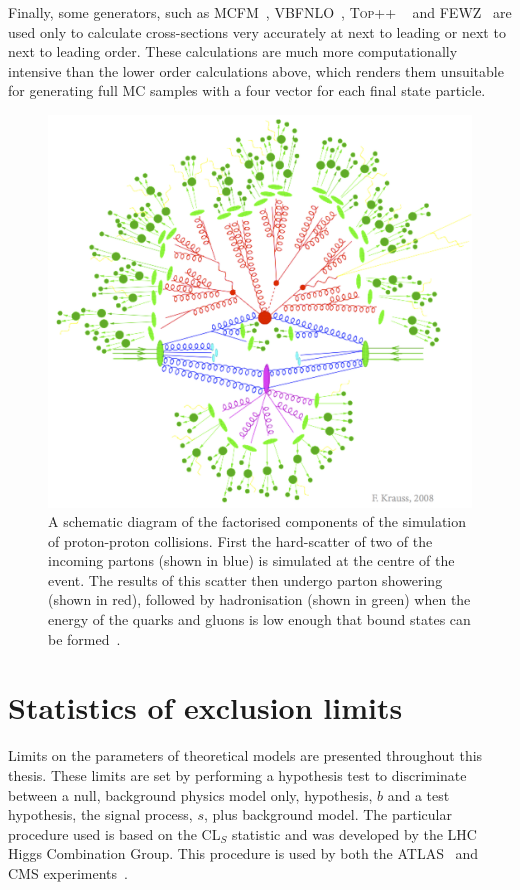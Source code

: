 Finally, some generators, such as MCFM~\cite{PhysRevD.68.094021}, VBFNLO~\cite{Baglio:2014uba,Arnold:2011wj,Arnold20091661}, \textsc{Top++} ~\cite{Czakon20142930} and \textsc{FEWZ}~\cite{PhysRevD.86.094034} are used only to calculate cross-sections very accurately at next to leading or next to next to leading order. These calculations are much more computationally intensive than the lower order calculations above, which renders them unsuitable for generating full \ac{MC} samples with a four vector for each final state particle.

\begin{figure}
  \includegraphics[width=\largefigwidth]{plots/theory/factorisation.png}
  \caption{A schematic diagram of the factorised components of the simulation of proton-proton collisions. First the hard-scatter of two of the incoming partons (shown in blue) is simulated at the centre of the event. The results of this scatter then undergo parton showering (shown in red), followed by hadronisation (shown in green) when the energy of the quarks and gluons is low enough that bound states can be formed~\cite{krauss-diag}.}
  \label{fig:factorisation}
\end{figure}

\section{Statistics of exclusion limits}
\label{sec:stats}
Limits on the parameters of theoretical models are presented throughout this thesis. These limits are set by performing a hypothesis test to discriminate between a null, background physics model only, hypothesis, $b$ and a test hypothesis, the signal process, $s$, plus background model. The particular procedure used is based on the CL$_{S}$ statistic and was developed by the LHC Higgs Combination Group. This procedure is used by both the ATLAS~\cite{Aad:1129811} and CMS experiments~\cite{ATL-PHYS-PUB-2011-011}. 

